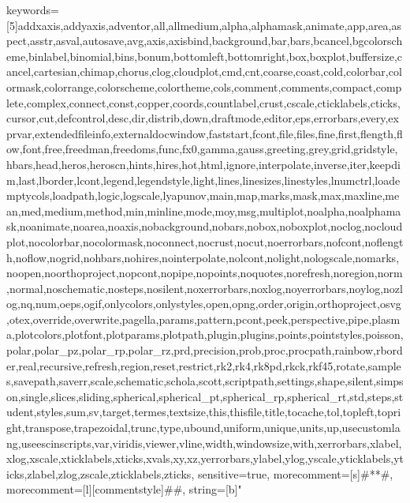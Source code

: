 {	keywords=[5]{addxaxis,addyaxis,adventor,all,allmedium,alpha,alphamask,animate,app,area,aspect,asstr,asval,autosave,avg,axis,axisbind,background,bar,bars,bcancel,bgcolorscheme,binlabel,binomial,bins,bonum,bottomleft,bottomright,box,boxplot,buffersize,cancel,cartesian,chimap,chorus,clog,cloudplot,cmd,cnt,coarse,coast,cold,colorbar,colormask,colorrange,colorscheme,colortheme,cols,comment,comments,compact,complete,complex,connect,const,copper,coords,countlabel,crust,cscale,cticklabels,cticks,cursor,cut,defcontrol,desc,dir,distrib,down,draftmode,editor,eps,errorbars,every,exprvar,extendedfileinfo,externaldocwindow,faststart,fcont,file,files,fine,first,flength,flow,font,free,freedman,freedoms,func,fx0,gamma,gauss,greeting,grey,grid,gridstyle,hbars,head,heros,heroscn,hints,hires,hot,html,ignore,interpolate,inverse,iter,keepdim,last,lborder,lcont,legend,legendstyle,light,lines,linesizes,linestyles,lnumctrl,loademptycols,loadpath,logic,logscale,lyapunov,main,map,marks,mask,max,maxline,mean,med,medium,method,min,minline,mode,moy,msg,multiplot,noalpha,noalphamask,noanimate,noarea,noaxis,nobackground,nobars,nobox,noboxplot,noclog,nocloudplot,nocolorbar,nocolormask,noconnect,nocrust,nocut,noerrorbars,nofcont,noflength,noflow,nogrid,nohbars,nohires,nointerpolate,nolcont,nolight,nologscale,nomarks,noopen,noorthoproject,nopcont,nopipe,nopoints,noquotes,norefresh,noregion,norm,normal,noschematic,nosteps,nosilent,noxerrorbars,noxlog,noyerrorbars,noylog,nozlog,nq,num,oeps,ogif,onlycolors,onlystyles,open,opng,order,origin,orthoproject,osvg,otex,override,overwrite,pagella,params,pattern,pcont,peek,perspective,pipe,plasma,plotcolors,plotfont,plotparams,plotpath,plugin,plugins,points,pointstyles,poisson,polar,polar_pz,polar_rp,polar_rz,prd,precision,prob,proc,procpath,rainbow,rborder,real,recursive,refresh,region,reset,restrict,rk2,rk4,rk8pd,rkck,rkf45,rotate,samples,savepath,saverr,scale,schematic,schola,scott,scriptpath,settings,shape,silent,simpson,single,slices,sliding,spherical,spherical_pt,spherical_rp,spherical_rt,std,steps,student,styles,sum,sv,target,termes,textsize,this,thisfile,title,tocache,tol,topleft,topright,transpose,trapezoidal,trunc,type,ubound,uniform,unique,units,up,usecustomlang,useescinscripts,var,viridis,viewer,vline,width,windowsize,with,xerrorbars,xlabel,xlog,xscale,xticklabels,xticks,xvals,xy,xz,yerrorbars,ylabel,ylog,yscale,yticklabels,yticks,zlabel,zlog,zscale,zticklabels,zticks},
	sensitive=true,
	morecomment=[s]{\#*}{*\#},
	morecomment=[l][commentstyle]{\#\#},
	string=[b]"
}
\newcommand\realnumberstyle[1]{\tiny}
\makeatletter
\newcommand{\zebra}[3]{%
    {\realnumberstyle{#3}}%
    \begingroup
    \lst@basicstyle
    \ifodd\value{lstnumber}%
        \color{#1}%
    \else
        \color{#2}%
    \fi
        \rlap{\hspace*{\lst@numbersep}%
        \color@block{\linewidth}{\ht\strutbox}{\dp\strutbox}%
        }%
    \endgroup
}
\makeatother

